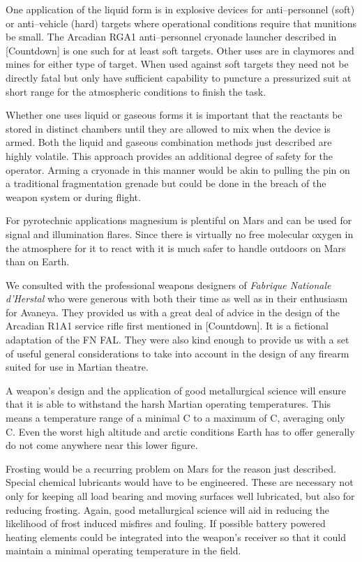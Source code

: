 One application of the liquid form is in explosive devices for anti--personnel (soft) or anti--vehicle (hard) targets where operational conditions require that munitions be small. The Arcadian RGA1 anti--personnel cryonade launcher described in [Countdown] is one such for at least soft targets. Other uses are in claymores and mines for either type of target. When used against soft targets they need not be directly fatal but only have sufficient capability to puncture a pressurized suit at short range for the atmospheric conditions to finish the task.

Whether one uses liquid or gaseous forms it is important that the reactants be stored in distinct chambers until they are allowed to mix when the device is armed. Both the liquid and gaseous combination methods just described are highly volatile. This approach provides an additional degree of safety for the operator. Arming a cryonade in this manner would be akin to pulling the pin on a traditional fragmentation grenade but could be done in the breach of the weapon system or during flight.

For pyrotechnic applications magnesium is plentiful on Mars and can be used for signal and illumination flares. Since there is virtually no free molecular oxygen in the atmosphere for it to react with it is much safer to handle outdoors on Mars than on Earth.


We consulted with the professional weapons designers of {\it Fabrique Nationale d'Herstal} who were generous with both their time as well as in their enthusiasm for Avaneya. They provided us with a great deal of advice in the design of the Arcadian R1A1 service rifle first mentioned in [Countdown]. It is a fictional adaptation of the FN FAL. They were also kind enough to provide us with a set of useful general considerations to take into account in the design of any firearm suited for use in Martian theatre.

A weapon's design and the application of good metallurgical science will ensure that it is able to withstand the harsh Martian operating temperatures. This means a temperature range of a minimal C to a maximum of C, averaging only C. Even the worst high altitude and arctic conditions Earth has to offer generally do not come anywhere near this lower figure. 

Frosting would be a recurring problem on Mars for the reason just described. Special chemical lubricants would have to be engineered. These are necessary not only for keeping all load bearing and moving surfaces well lubricated, but also for reducing frosting. Again, good metallurgical science will aid in reducing the likelihood of frost induced misfires and fouling. If possible battery powered heating elements could be integrated into the weapon's receiver so that it could maintain a minimal operating temperature in the field.

